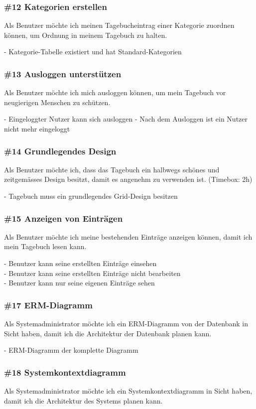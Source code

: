 \subsubsection*{\#12 Kategorien erstellen}
Als Benutzer möchte ich meinen Tagebucheintrag einer Kategorie zuordnen können, um Ordnung in meinem Tagebuch zu halten.

\noindent
- Kategorie-Tabelle existiert und hat Standard-Kategorien


\subsubsection*{\#13 Ausloggen unterstützen}
Als Benutzer möchte ich mich ausloggen können, um mein Tagebuch vor neugierigen Menschen zu schützen.

\noindent
- Eingeloggter Nutzer kann sich ausloggen
- Nach dem Ausloggen ist ein Nutzer nicht mehr eingeloggt


\subsubsection*{\#14 Grundlegendes Design}
Als Benutzer möchte ich, dass das Tagebuch ein halbwegs schönes und zeitgemässes Design besitzt, damit es angenehm zu verwenden ist. (Timebox: 2h)

\noindent
- Tagebuch muss ein grundlegendes Grid-Design besitzen


\subsubsection*{\#15 Anzeigen von Einträgen}
Als Benutzer möchte ich meine bestehenden Einträge anzeigen können, damit ich mein Tagebuch lesen kann.

\noindent
- Benutzer kann seine erstellten Einträge einsehen\\
- Benutzer kann seine erstellten Einträge nicht bearbeiten\\
- Benutzer kann nur seine eigenen Einträge sehen

\subsubsection*{\#17 ERM-Diagramm}
Als Systemadministrator möchte ich ein ERM-Diagramm von der Datenbank in Sicht haben, damit ich die Architektur der Datenbank planen kann.

\noindent
- ERM-Diagramm der komplette Diagramm

\subsubsection*{\#18 Systemkontextdiagramm}
Als Systemadministrator möchte ich ein Systemkontextdiagramm in Sicht haben, damit ich die Architektur des Systems planen kann.

